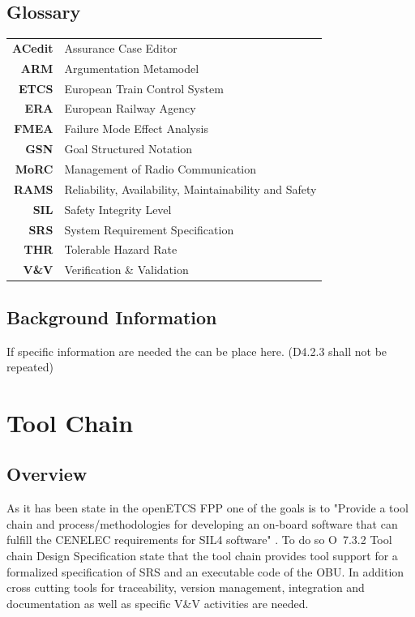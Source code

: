 \documentclass{template/openetcs_report}
\begin{document}

\section{Glossary}
\label{sec:glossary}



\begin{tabular}{rl}
\textbf{ACedit} & Assurance Case Editor \\ 
\textbf{ARM} & Argumentation  Metamodel \\ 
\textbf{ETCS} & European Train Control System \\ \textbf{ERA} & European Railway Agency \\ \textbf{FMEA} & Failure Mode Effect Analysis \\ 
\textbf{GSN} & Goal Structured Notation \\ 
\textbf{MoRC} & Management of Radio Communication \\ 
\textbf{RAMS} & Reliability, Availability, Maintainability and Safety \\
\textbf{SIL} & Safety Integrity Level \\ 
\textbf{SRS} & System Requirement Specification \\ 
\textbf{THR} & Tolerable Hazard Rate \\ 
\textbf{V\&V} & Verification \& Validation \\ 
\end{tabular} 




\section{Background Information}
\label{sec:Background}


If specific information are needed the can be place here. (D4.2.3 shall not be repeated)


\chapter{Tool Chain}
\label{toolchain}
\section{Overview}

As it has been state in the openETCS FPP one of the goals  is to "Provide a tool chain and process/methodologies for developing an on-board software that can fulfill the CENELEC requirements for SIL4 software" \cite{FPP}. To do so O~7.3.2 Tool chain Design Specification state that the tool chain  provides tool support for a formalized specification of SRS and an executable code of the OBU. In addition cross cutting tools for traceability, version management, integration and documentation as well as specific V\&V activities are needed.
\end{document}

